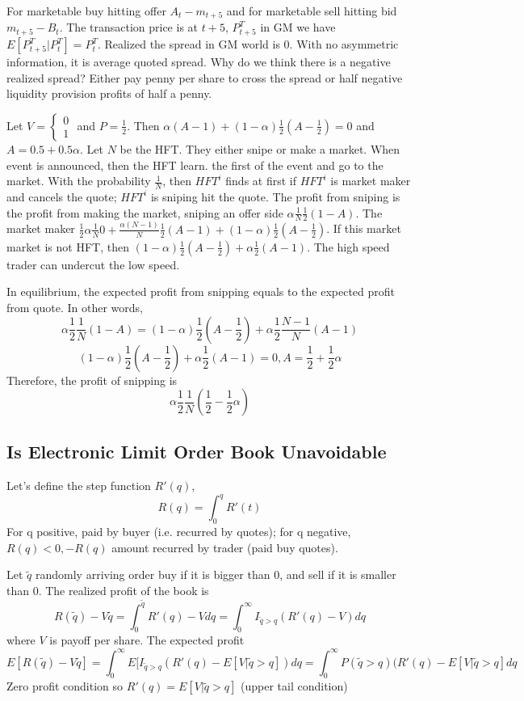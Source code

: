 \documentclass[11pt, a4paper, oneside]{article}
\theoremstyle{definition}
\theoremstyle{proposition}
\theoremstyle{corollary}
\theoremstyle{lemma}
\theoremstyle{theorem}
\begin{document}
For marketable buy hitting offer $A_t - m_{t+5}$ and for marketable sell hitting bid $m_{t+5} - B_t$. The transaction price is at $t+5$, $P^T_{t+5}$ in GM we have $E[P_{t+5}^T|P_t^T] = P_t^T$. Realized the spread in GM world is 0. With no asymmetric information, it is average quoted spread. Why do we think there is a negative realized spread? Either pay penny per share to cross the spread or half negative liquidity provision profits of half a penny. 

Let $V = \begin{cases} 0 \\ 1 \end{cases}$ and $P = \frac{1}{2}$. Then 
$\alpha(A - 1) + (1- \alpha)\frac{1}{2}(A - \frac{1}{2}) = 0$ and $A = 0.5 + 0.5 \alpha$. Let $N$ be the HFT. They either snipe or make a market. When event is announced, then the HFT learn. the first of the event and go to the market. With the probability $\frac{1}{N}$, then $HFT^i$ finds at first if $HFT^i$ is market maker and cancels the quote; $HFT^i$ is sniping hit the quote. The profit from sniping is the profit from making the market, sniping an offer side $\alpha\frac{1}{N}\frac{1}{2}(1 - A)$. The market maker $\frac{1}{2}\alpha\frac{1}{N} 0+ \frac{\alpha(N-1)}{N}\frac{1}{2}(A - 1) + (1- \alpha)\frac{1}{2}(A - \frac{1}{2})$. If this market market is not HFT, then $(1- \alpha)\frac{1}{2} (A - \frac{1}{2}) + \alpha \frac{1}{2}(A - 1)$. The high speed trader can undercut the low speed. 

In equilibrium, the expected profit from snipping equals to the expected profit from quote. In other words, 
$$\alpha \frac{1}{2} \frac{1}{N}(1- A) = (1- \alpha) \frac{1}{2} (A - \frac{1}{2}) + \alpha \frac{1}{2} \frac{N-1}{N}(A - 1)$$
$$(1- \alpha) \frac{1}{2} ( A - \frac{1}{2}) + \alpha \frac{1}{2} ( A - 1) = 0, A = \frac{1}{2} + \frac{1}{2}\alpha$$
Therefore, the profit of snipping is
$$\alpha \frac{1}{2}\frac{1}{N}(\frac{1}{2} - \frac{1}{2}\alpha)$$

\subsection{Is Electronic Limit Order Book Unavoidable}
Let's define the step function $R'(q)$, 
$$R(q) = \int_0^q R'(t)$$
For q positive, paid by buyer (i.e. recurred by quotes); for q negative, $R(q) < 0, -R(q)$ amount recurred by trader (paid buy quotes). 

Let $\tilde{q}$ randomly arriving order buy if it is bigger than 0, and sell if it is smaller than 0. The realized profit of the book is 
$$R(\tilde{q}) - V\tilde{q} = \int_0^{\tilde{q}} R'(q) - Vdq = \int_0^{\infty} I_{\tilde{q} > q}(R'(q) - V) dq$$ 
where $V$ is payoff per share. 
The expected profit 
$$E[R(\tilde{q}) - V\tilde{q}] = \int_0^{\infty} E[I_{\tilde{q} > q}(R'(q) - E[V|\tilde{q} > q])dq = \int_0^{\infty}P(\tilde{q} > q)(R'(q) - E[V|\tilde{q} > q] dq$$
Zero profit condition so $R'(q) = E[V|\tilde{q}> q]$ (upper tail condition)
\end{document}
